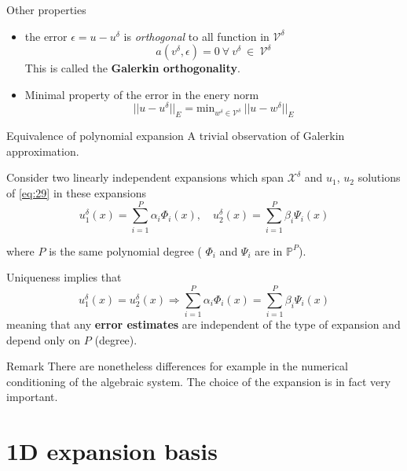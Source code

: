 \begin{frame}{Other properties}
  \begin{itemize}
  \item the error $\epsilon = u-u^\delta$ is \emph{orthogonal} to all function in $\mathcal{V}^\delta$
    \begin{equation}
      \label{eq:33}
      a(v^\delta, \epsilon) = 0\ \forall\ v^\delta\ \in\ \mathcal{V}^\delta
    \end{equation}
    This is called the \textbf{Galerkin orthogonality}.
  \item Minimal property of the error in the enery norm
    \begin{equation}
      \label{eq:34}
      ||u-u^\delta||_E = \mathrm{min}_{w^{\delta} \in \mathcal{V}^\delta}\ ||u-w^\delta||_E
    \end{equation}
  \end{itemize}
\end{frame}

\begin{frame}{Equivalence of polynomial expansion}
  A trivial observation of Galerkin approximation.
  
  Consider two linearly independent expansions which span
  $\mathcal{X}^\delta$ and $u_1$, $u_2$  solutions of \eqref{eq:29} in these
  expansions
  \begin{equation}
    \label{eq:36}
    u_1^\delta(x) = \sum_{i=1}^P \alpha_i \Phi_i(x), \quad u_2^\delta(x) = \sum_{i=1}^P \beta_i \Psi_i(x)
  \end{equation}
  
  where $P$ is the same polynomial degree ( $\Phi_i$ and $\Psi_i$ are in $\mathbb{P}^P$).

  Uniqueness implies that
  \begin{equation}
    \label{eq:37}
    u_1^\delta(x) = u_2^\delta(x) \Rightarrow \sum_{i=1}^P \alpha_i \Phi_i(x) = \sum_{i=1}^P \beta_i \Psi_i(x)
  \end{equation}
  meaning that any \textbf{error estimates} are independent of the type of expansion and depend only on $P$ (degree).
  
  \begin{alertblock}{Remark}
    There are nonetheless differences for example in the numerical
    conditioning of the algebraic system. The choice of the expansion
    is in fact very important.
  \end{alertblock}
\end{frame}

\section{1D expansion basis}
\label{sec:1d-expansion-basis}

